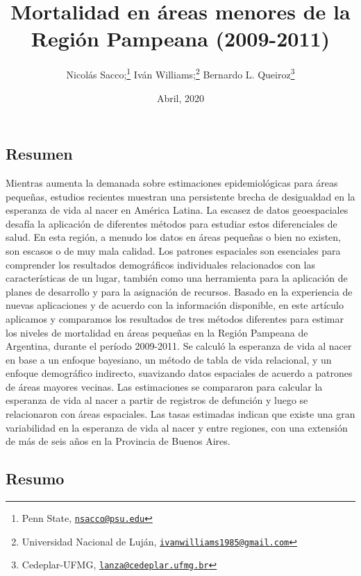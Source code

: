 \documentclass[12pt,]{article}
\title{Mortalidad en áreas menores de la Región Pampeana (2009-2011)}
\author{Nicolás Sacco;\footnote{Penn State,
  \href{mailto:nsacco@psu.edu}{\nolinkurl{nsacco@psu.edu}}} Iván
Williams;\footnote{Universidad Nacional de Luján,
  \href{mailto:ivanwilliams1985@gmail.com}{\nolinkurl{ivanwilliams1985@gmail.com}}}
Bernardo L. Queiroz\footnote{Cedeplar-UFMG,
  \href{mailto:lanza@cedeplar.ufmg.br}{\nolinkurl{lanza@cedeplar.ufmg.br}}}}
\date{Abril, 2020}
\begin{document}
\maketitle

\hypertarget{resumen}{%
\subsection{Resumen}\label{resumen}}

Mientras aumenta la demanada sobre estimaciones epidemiológicas para
áreas pequeñas, estudios recientes muestran una persistente brecha de
desigualdad en la esperanza de vida al nacer en América Latina. La
escasez de datos geoespaciales desafía la aplicación de diferentes
métodos para estudiar estos diferenciales de salud. En esta región, a
menudo los datos en áreas pequeñas o bien no existen, son escasos o de
muy mala calidad. Los patrones espaciales son esenciales para comprender
los resultados demográficos individuales relacionados con las
características de un lugar, también como una herramienta para la
aplicación de planes de desarrollo y para la asignación de recursos.
Basado en la experiencia de nuevas aplicaciones y de acuerdo con la
información disponible, en este artículo aplicamos y comparamos los
resultados de tres métodos diferentes para estimar los niveles de
mortalidad en áreas pequeñas en la Región Pampeana de Argentina, durante
el período 2009-2011. Se calculó la esperanza de vida al nacer en base a
un enfoque bayesiano, un método de tabla de vida relacional, y un
enfoque demográfico indirecto, suavizando datos espaciales de acuerdo a
patrones de áreas mayores vecinas. Las estimaciones se compararon para
calcular la esperanza de vida al nacer a partir de registros de
defunción y luego se relacionaron con áreas espaciales. Las tasas
estimadas indican que existe una gran variabilidad en la esperanza de
vida al nacer y entre regiones, con una extensión de más de seis años en
la Provincia de Buenos Aires.

\hypertarget{resumo}{%
\subsection{Resumo}\label{resumo}}
\end{document}
